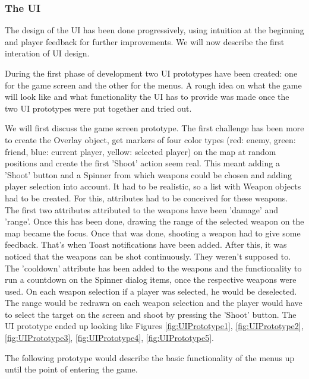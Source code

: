 \subsubsection{The UI}

The design of the UI has been done progressively, using intuition at the
beginning and player feedback for further improvements. We will now describe the
first interation of UI design.\newline

During the first phase of development two UI prototypes have been created: one
for the game screen and the other for the menus. A rough idea on what the game
will look like and what functionality the UI has to provide was made once the
two UI prototypes were put together and tried out.\newline

We will first discuss the game screen prototype. The first challenge has been
more to create the Overlay object, get markers of four color types (red: enemy,
green: friend, blue: current player, yellow: selected player) on the map at
random positions and create the first 'Shoot' action seem real. This meant
adding a 'Shoot' button and a Spinner from which weapons could be chosen and
adding player selection into account. It had to be realistic, so a list with
Weapon objects had to be created. For this, attributes had to be conceived for
these weapons. The first two attributes attributed to the weapons have
been 'damage' and 'range'. Once this has been done, drawing the range of the
selected weapon on the map became the focus. Once that was done, shooting a
weapon had to give some feedback. That's when Toast notifications have been
added. After this, it was noticed that the weapons can be shot continuously.
They weren't supposed to. The 'cooldown' attribute has been added to the
weapons and the functionality to run a countdown on the Spinner dialog items,
once the respective weapons were used. On each weapon selection if a player was
selected, he would be deselected. The range would be redrawn on each weapon
selection and the player would have to select the target on the screen and shoot
by pressing the 'Shoot' button. The UI prototype ended up looking like Figures
\ref{fig:UIPrototype1}, \ref{fig:UIPrototype2}, \ref{fig:UIPrototype3}, \ref{fig:UIPrototype4}, \ref{fig:UIPrototype5}.\newline

The following prototype would describe the basic functionality of the menus up
until the point of entering the game.\newline



